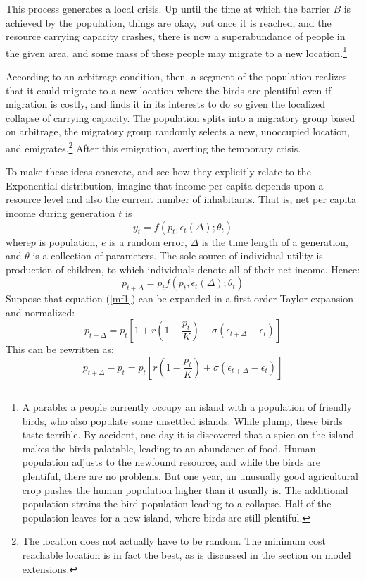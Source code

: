\documentclass[11pt]{article}
\begin{document}
{This process generates a local crisis. Up until the time at which the barrier $B$ is achieved by the population, things are okay, but once it is reached, and the resource carrying capacity crashes,   there is now a superabundance of people in the given area, and some mass of these people may migrate to a new location.\footnote{A parable: a people currently occupy an island with a population of friendly birds, who also populate some unsettled islands. While plump, these birds taste terrible. By accident, one day it is discovered that a spice on the island makes the birds palatable, leading to an abundance of food. Human population adjusts to the newfound resource, and while the birds are plentiful, there are no problems. But one year, an unusually good agricultural crop pushes the human population higher than it usually is. The additional population strains the bird population leading to a collapse. Half of the population leaves for a new island, where birds are still plentiful.}



According to an arbitrage condition, then, a segment of the population realizes that it could migrate to a new location where the birds are plentiful even if migration is costly, and finds it in its interests to do so given the localized collapse of carrying capacity. The population splits into a migratory group based on arbitrage, the migratory group randomly selects a new, unoccupied location, and emigrates.\footnote{The location does not actually have to be random. The minimum cost reachable location is in fact the best, as is discussed in the section on model extensions.} After this emigration, averting the temporary crisis.



To make these ideas concrete,  and see how they explicitly relate to the Exponential distribution, imagine that income per capita depends upon a resource level and also the current number of inhabitants. That is, net per capita income during generation $t$ is
\begin{equation}
y_t=f(p_t,\epsilon_t(\Delta);\theta_t)
\end{equation} 
where$p$ is population, $e$ is a random error, $\Delta$ is the time length of a generation, and $\theta$ is a collection of parameters. The sole source of individual utility is production of children, to which individuals denote all of their net income. Hence:
\begin{equation} \label{mf1}
p_{t+\Delta}=p_tf(p_t,\epsilon_t(\Delta);\theta_t)
\end{equation}
Suppose that equation (\ref{mf1}) can be expanded in a first-order  Taylor expansion and normalized:
\begin{equation*}
p_{t+\Delta}=p_t\left[1+r\left(1-\frac{p_t}{K}\right)+\sigma(\epsilon_{t+\Delta}-\epsilon_t)\right]
\end{equation*}
This can be rewritten as:
\begin{equation} \label{mf2} p_{t+\Delta}-p_t=p_t\left[r\left(1-\frac{p_t}{K}\right)+\sigma(\epsilon_{t+\Delta}-\epsilon_t)\right]
\end{equation}

}
\end{document}
